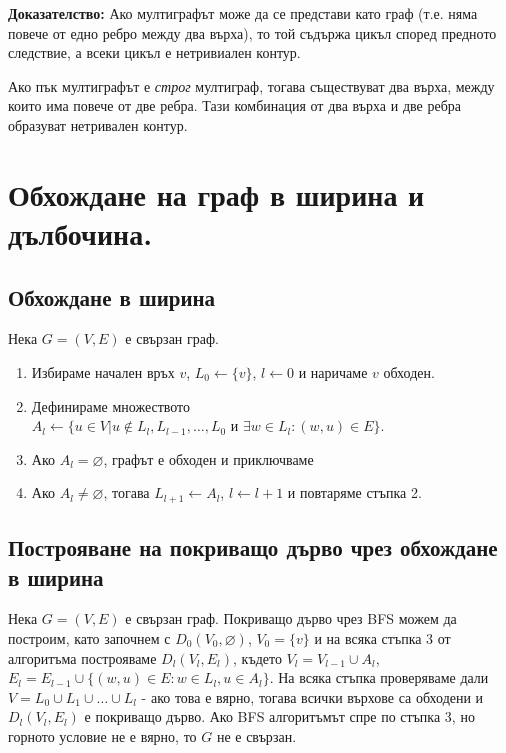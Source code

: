 \documentclass[fleqn,12pt]{article}
\begin{document}
\textbf{Доказателство: } Ако мултиграфът може да се представи като граф (т.е. няма повече от едно ребро между два върха), то той
съдържа цикъл според предното следствие, а всеки цикъл е нетривиален контур.

Ако пък мултиграфът е \textit{строг} мултиграф, тогава съществуват два върха, между които има повече от две ребра. Тази комбинация от два върха и две ребра
образуват нетривален контур.

\section{Обхождане на граф в ширина и дълбочина.}

\subsection{Обхождане в ширина} 
Нека $G = (V, E)$ е свързан граф. 
\begin{enumerate}
	\item Избираме начален връх $v$, $L_0 \leftarrow \{ v \}$, $l \leftarrow 0$ и наричаме $v$ обходен.
	\item Дефинираме множеството $A_l \leftarrow \{ u \in V | u \notin L_l, L_{l-1}, \dots, L_0 \text{ и } \exists w \in L_l : (w, u) \in E \}$.
	\item Ако $A_l = \varnothing$, графът е обходен и приключваме
	\item Ако $A_l \neq \varnothing$, тогава $L_{l+1} \leftarrow A_l$, $ l \leftarrow l + 1$ и повтаряме стъпка 2.
\end{enumerate}

\subsection{Построяване на покриващо дърво чрез обхождане в ширина} 
Нека $G = (V, E)$ е свързан граф.
Покриващо дърво чрез BFS можем да построим, като започнем с $D_0(V_0, \varnothing)$, $V_0 = \{ v \}$ и на всяка стъпка 3 
от алгоритъма построяваме $D_l(V_l, E_l)$, където $V_l = V_{l - 1} \cup A_l$, 
$E_l = E_{l - 1} \cup \{ (w, u) \in E : w \in L_l, u \in A_l \}$. На всяка стъпка проверяваме дали 
$V = L_0 \cup L_1 \cup \dots \cup L_l$ - ако това е вярно, тогава всички върхове са обходени и $D_l(V_l, E_l)$ е покриващо дърво.
Ако BFS алгоритъмът спре по стъпка 3, но горното условие не е вярно, то $G$ не е свързан.
\vspace{10mm}
\end{document}
